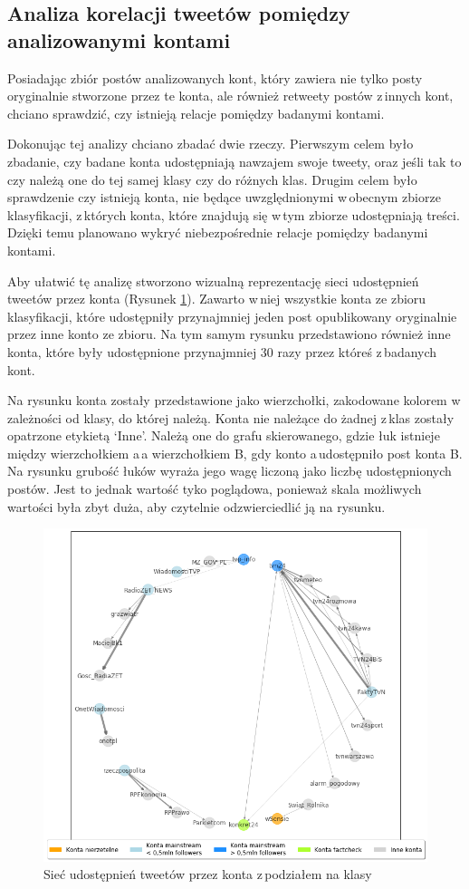 \subsection{Analiza korelacji tweetów pomiędzy analizowanymi kontami }
Posiadając zbiór postów analizowanych kont, który zawiera nie tylko posty oryginalnie stworzone przez te konta, ale również retweety postów z\,innych kont, chciano sprawdzić, czy istnieją relacje pomiędzy badanymi kontami. 
\par
Dokonując tej analizy chciano zbadać dwie rzeczy. Pierwszym celem było zbadanie, czy badane konta udostępniają nawzajem swoje tweety, oraz jeśli tak to czy należą one do tej samej klasy czy do różnych klas. Drugim celem było sprawdzenie czy istnieją konta, nie będące uwzględnionymi w\,obecnym zbiorze klasyfikacji, z\,których konta, które znajdują się w\,tym zbiorze udostępniają treści. Dzięki temu planowano wykryć niebezpośrednie relacje pomiędzy badanymi kontami.
\par
Aby ułatwić tę analizę stworzono wizualną reprezentację sieci udostępnień tweetów przez konta (Rysunek \ref{fig:connectedaccounts}). Zawarto w\,niej wszystkie konta ze zbioru klasyfikacji, które udostępniły przynajmniej jeden post opublikowany oryginalnie przez inne konto ze zbioru. Na tym samym rysunku przedstawiono również inne konta, które były udostępnione przynajmniej 30 razy przez któreś z\,badanych kont. 
\par
Na rysunku konta zostały przedstawione jako wierzchołki, zakodowane kolorem w\,zależności od klasy, do której należą. Konta nie należące do żadnej z\,klas zostały opatrzone etykietą ‘Inne’. Należą one do grafu skierowanego, gdzie łuk istnieje między wierzchołkiem a\,a wierzchołkiem B, gdy konto a\,udostępniło post konta B. Na rysunku grubość łuków wyraża jego wagę liczoną jako liczbę udostępnionych postów. Jest to jednak wartość tyko poglądowa, ponieważ skala możliwych wartości była zbyt duża, aby czytelnie odzwierciedlić ją na rysunku. 
\begin{figure}[!h]
	\centering \includegraphics[width=1.0\linewidth]{img/results/connectionbetweenaccounts.png}
	\caption{Sieć udostępnień tweetów przez konta z\,podziałem na  klasy} \label{fig:connectedaccounts}
\end{figure}
